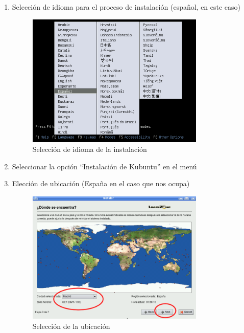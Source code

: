 \begin{enumerate}
 \item Selección de idioma para el proceso de instalación (español, en este caso)
\begin{figure}[htb!]
 \centering
 \includegraphics[width=0.8\textwidth]{Utils/instalacion1.png}
 \caption{Selección de idioma de la instalación}
 \label{fig:instalacion1}
\end{figure}

\item Seleccionar la opción ``Instalación de Kubuntu'' en el menú

\item Elección de ubicación (España en el caso que nos ocupa)

\begin{figure}[htb!]
 \centering
 \includegraphics[width=0.8\textwidth]{Utils/instalacion4.png}
 \caption{Selección de la ubicación}
 \label{fig:instalacion4}
\end{figure}


\end{enumerate}
